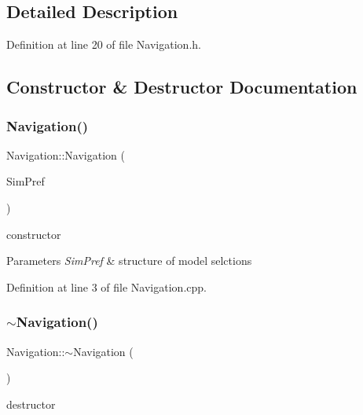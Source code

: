 \subsection{Detailed Description}


Definition at line 20 of file Navigation.\+h.



\subsection{Constructor \& Destructor Documentation}
\mbox{\label{class_navigation_a00594eb04a4ec3c7b40ce73bec65f1ee}} 
\subsubsection{\texorpdfstring{Navigation()}{Navigation()}}
{\footnotesize\ttfamily Navigation\+::\+Navigation (\begin{DoxyParamCaption}\item[{Sim\+D\+Preference \&}]{Sim\+Pref }\end{DoxyParamCaption})}



constructor 


\begin{DoxyParams}{Parameters}
{\em Sim\+Pref} & structure of model selctions \\
\hline
\end{DoxyParams}


Definition at line 3 of file Navigation.\+cpp.

\mbox{\label{class_navigation_addd4022d716df48f4e55a1db69361ba7}} 
\subsubsection{\texorpdfstring{$\sim$\+Navigation()}{~Navigation()}}
{\footnotesize\ttfamily Navigation\+::$\sim$\+Navigation (\begin{DoxyParamCaption}{ }\end{DoxyParamCaption})}



destructor 



